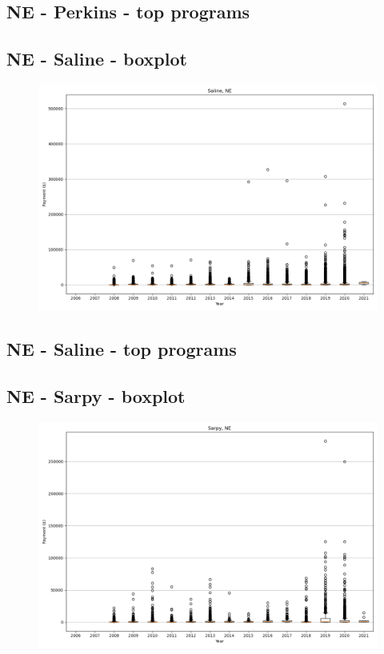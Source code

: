 \subsection*{NE - Perkins - top programs}

\newpage
\subsection*{NE - Saline - boxplot}
\begin{figure}[h]
\centering
\includegraphics[width=7in]{../output/boxplots/counties/Saline-NE_boxplot.png}
\end{figure}


\subsection*{NE - Saline - top programs}

\newpage
\subsection*{NE - Sarpy - boxplot}
\begin{figure}[h]
\centering
\includegraphics[width=7in]{../output/boxplots/counties/Sarpy-NE_boxplot.png}
\end{figure}


